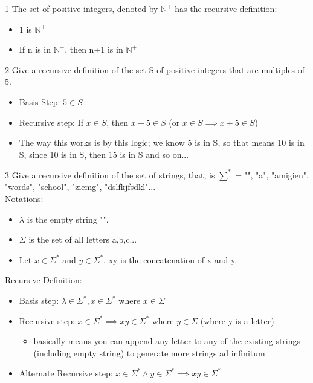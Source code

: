 \documentclass[12pt, letterpaper]{article}
\newcommand{\exheader}[1][ex]{{\tiny{#1}\normalsize}}
\begin{document}
\exheader[1] The set of positive integers, denoted by $\mathbb{N}^+$ has the recursive definition:
\begin{itemize}[leftmargin=*, label={}]
	\item 1 is $\mathbb{N}^+$
	\item If n is in $\mathbb{N}^+$, then n+1 is in $\mathbb{N}^+$
\end{itemize}

\bigbreak

\exheader[2] Give a recursive definition of the set S of positive integers that are multiples of 5.
\begin{itemize}[leftmargin=*, label={}]
	\item Basis Step: $5 \in S$
	\item Recursive step: If $x \in S$, then $x+5 \in S$ (or $x \in S \implies x + 5 \in S$)
	\item The way this works is by this logic; we know 5 is in S, so that means 10 is in S, since 10 is in S, then 15 is in S and so on...
\end{itemize}

\bigbreak

\exheader[3] Give a recursive definition of the set of strings, that, is $\sum^* = ${"", "a", "amigien", "words", "school", "ziemg", "dslfkjfsdkl"...} \\ 
Notations: 
\begin{itemize}[leftmargin=*, label={}]
	\item $\lambda$ is the empty string "".
	\item $\Sigma$ is the set of all letters {a,b,c...}
	\item Let $x \in \Sigma^*$ and $y \in \Sigma^*$. xy is the concatenation of x and y.
\end{itemize}
Recursive Definition:
\begin{itemize}[leftmargin=*, label={}]
	\item Basis step: $\lambda \in \Sigma^*, x \in \Sigma^*$ where $x \in \Sigma$
	\item Recursive step: $x \in \Sigma^* \implies xy \in \Sigma^*$ where $y \in \Sigma$ {\small (where y is a letter)}
	\begin{itemize}[label={}]
		\item basically means you can append any letter to any of the existing strings (including empty string) to generate more strings ad infinitum
	\end{itemize}
	\item Alternate Recursive step: $x \in \Sigma^* \land y \in \Sigma^* \implies xy \in \Sigma^*$
\end{itemize}
\bigbreak
{}
\end{document}

